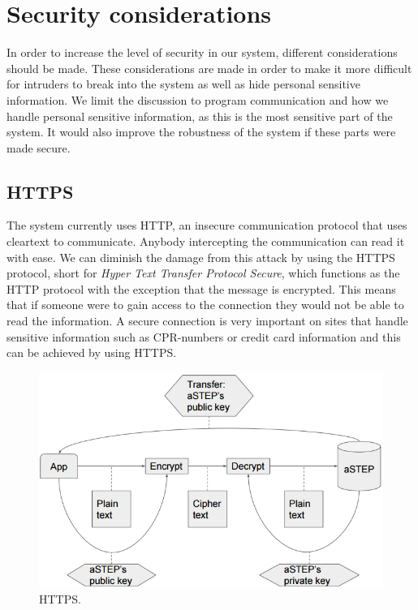 \section{Security considerations}\label{sec:secure}
In order to increase the level of security in our system, different considerations should be made. These considerations are made in order to make it more difficult for intruders to break into the system as well as hide personal sensitive information. We limit the discussion to program communication and how we handle personal sensitive information, as this is the most sensitive part of the system. It would also improve the robustness of the system if these parts were made secure.

\subsection*{HTTPS} 
The system currently uses HTTP, an insecure communication protocol that uses cleartext to communicate. Anybody intercepting the communication can read it with ease. We can diminish the damage from this attack by using the HTTPS protocol, short for \textit{Hyper Text Transfer Protocol Secure}, which functions as the HTTP protocol with the exception that the message is encrypted. This means that if someone were to gain access to the connection they would not be able to read the information. A secure connection is very important on sites that handle sensitive information such as CPR-numbers or credit card information and this can be achieved by using HTTPS\cite{HTTPS}.

\begin{figure}[ht]
	\begin{center}
		\includegraphics[scale=0.9]{graphics/encrypt_decrypt.png}
		\caption{HTTPS.}
		\label{fig:HTTPS}
	\end{center} 
\end{figure}

